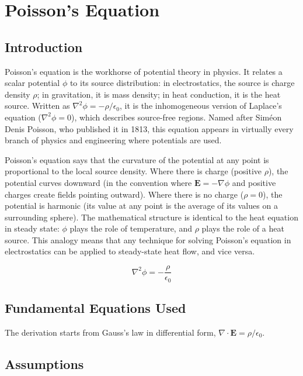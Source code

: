 \chapter{Poisson's Equation}

\section*{Introduction}

Poisson's equation is the workhorse of potential theory in physics. It relates a scalar potential $\phi$ to its source distribution: in electrostatics, the source is charge density $\rho$; in gravitation, it is mass density; in heat conduction, it is the heat source. Written as $\nabla^2\phi = -\rho/\epsilon_0$, it is the inhomogeneous version of Laplace's equation ($\nabla^2\phi = 0$), which describes source-free regions. Named after Siméon Denis Poisson, who published it in 1813, this equation appears in virtually every branch of physics and engineering where potentials are used.

Poisson's equation says that the curvature of the potential at any point is proportional to the local source density. Where there is charge (positive $\rho$), the potential curves downward (in the convention where $\mathbf{E} = -\nabla\phi$ and positive charges create fields pointing outward). Where there is no charge ($\rho = 0$), the potential is harmonic (its value at any point is the average of its values on a surrounding sphere). The mathematical structure is identical to the heat equation in steady state: $\phi$ plays the role of temperature, and $\rho$ plays the role of a heat source. This analogy means that any technique for solving Poisson's equation in electrostatics can be applied to steady-state heat flow, and vice versa.


\begin{equation}
\nabla^2\phi = -\frac{\rho}{\epsilon_0}
\end{equation}

\section*{Fundamental Equations Used}

The derivation starts from Gauss's law in differential form, $\nabla\cdot\mathbf{E} = \rho/\epsilon_0$.

\section*{Assumptions}

